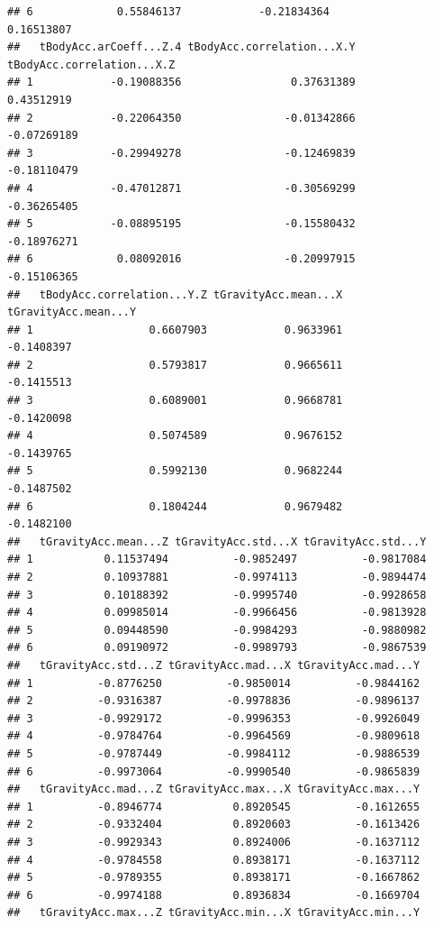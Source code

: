\documentclass[
]{article}
\begin{document}
\begin{verbatim}
## 6             0.55846137            -0.21834364             0.16513807
##   tBodyAcc.arCoeff...Z.4 tBodyAcc.correlation...X.Y tBodyAcc.correlation...X.Z
## 1            -0.19088356                 0.37631389                 0.43512919
## 2            -0.22064350                -0.01342866                -0.07269189
## 3            -0.29949278                -0.12469839                -0.18110479
## 4            -0.47012871                -0.30569299                -0.36265405
## 5            -0.08895195                -0.15580432                -0.18976271
## 6             0.08092016                -0.20997915                -0.15106365
##   tBodyAcc.correlation...Y.Z tGravityAcc.mean...X tGravityAcc.mean...Y
## 1                  0.6607903            0.9633961           -0.1408397
## 2                  0.5793817            0.9665611           -0.1415513
## 3                  0.6089001            0.9668781           -0.1420098
## 4                  0.5074589            0.9676152           -0.1439765
## 5                  0.5992130            0.9682244           -0.1487502
## 6                  0.1804244            0.9679482           -0.1482100
##   tGravityAcc.mean...Z tGravityAcc.std...X tGravityAcc.std...Y
## 1           0.11537494          -0.9852497          -0.9817084
## 2           0.10937881          -0.9974113          -0.9894474
## 3           0.10188392          -0.9995740          -0.9928658
## 4           0.09985014          -0.9966456          -0.9813928
## 5           0.09448590          -0.9984293          -0.9880982
## 6           0.09190972          -0.9989793          -0.9867539
##   tGravityAcc.std...Z tGravityAcc.mad...X tGravityAcc.mad...Y
## 1          -0.8776250          -0.9850014          -0.9844162
## 2          -0.9316387          -0.9978836          -0.9896137
## 3          -0.9929172          -0.9996353          -0.9926049
## 4          -0.9784764          -0.9964569          -0.9809618
## 5          -0.9787449          -0.9984112          -0.9886539
## 6          -0.9973064          -0.9990540          -0.9865839
##   tGravityAcc.mad...Z tGravityAcc.max...X tGravityAcc.max...Y
## 1          -0.8946774           0.8920545          -0.1612655
## 2          -0.9332404           0.8920603          -0.1613426
## 3          -0.9929343           0.8924006          -0.1637112
## 4          -0.9784558           0.8938171          -0.1637112
## 5          -0.9789355           0.8938171          -0.1667862
## 6          -0.9974188           0.8936834          -0.1669704
##   tGravityAcc.max...Z tGravityAcc.min...X tGravityAcc.min...Y

\end{verbatim}
\end{document}
